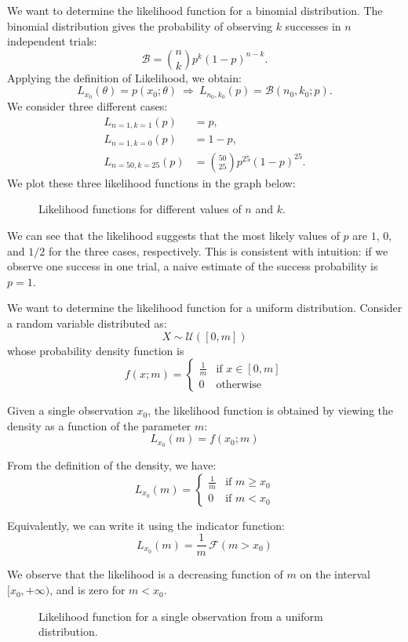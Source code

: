 \begin{example}
	We want to determine the likelihood function for a binomial distribution. The binomial distribution gives the probability of observing $k$ successes in $n$ independent trials:
	\[
	\mathcal{B}=\binom{n}{k}p^k(1-p)^{n-k}.
	\]
	Applying the definition of Likelihood, we obtain:
	\[
	L_{x_0}(\theta)=p(x_0;\theta)\ \Rightarrow\ L_{n_0,k_0}(p)=\mathcal{B}(n_0,k_0;p).
	\]
	We consider three different cases:
	\begin{align*}
		L_{n=1,k=1}(p) &= p, \\
		L_{n=1,k=0}(p) &= 1-p, \\
		L_{n=50,k=25}(p) &= \binom{50}{25}p^{25}(1-p)^{25}.
	\end{align*}
	We plot these three likelihood functions in the graph below:
	\begin{figure}[H]
		\centering
		
		\caption{Likelihood functions for different values of $n$ and $k$.}
		\label{fig:binomial_likelihood}
	\end{figure}
	We can see that the likelihood suggests that the most likely values of $p$ are $1$, $0$, and $1/2$ for the three cases, respectively. This is consistent with intuition: if we observe one success in one trial, a naive estimate of the success probability is $p=1$.
\end{example}

\begin{example}\label{ex:uniform_likelihood}
	We want to determine the likelihood function for a uniform distribution. Consider a random variable distributed as:
	\[
	X \sim \mathcal{U}([0,m])
	\]
	whose probability density function is
	\[
	f(x;m)=
	\begin{cases}
		\frac{1}{m} & \text{if } x \in [0,m] \\
		0 & \text{otherwise}
	\end{cases}
	\]
	
	Given a single observation $x_0$, the likelihood function is obtained by viewing the density as a function of the parameter $m$:
	\[
	L_{x_0}(m) = f(x_0;m)
	\]
	
	From the definition of the density, we have:
	\[
	L_{x_0}(m)=
	\begin{cases}
		\frac{1}{m} & \text{if } m \ge x_0 \\
		0 & \text{if } m < x_0
	\end{cases}
	\]
	
	Equivalently, we can write it using the indicator function:
	\[
	L_{x_0}(m)=\frac{1}{m}\,\mathscr{F}(m>x_0)
	\]
	
	We observe that the likelihood is a decreasing function of $m$ on the interval $[x_0,+\infty)$, and is zero for $m < x_0$.	
	\begin{figure}[H]
		\centering
		
		\caption{Likelihood function for a single observation from a uniform distribution.}
		\label{fig:uniform_likelihood}
	\end{figure}
\end{example}

